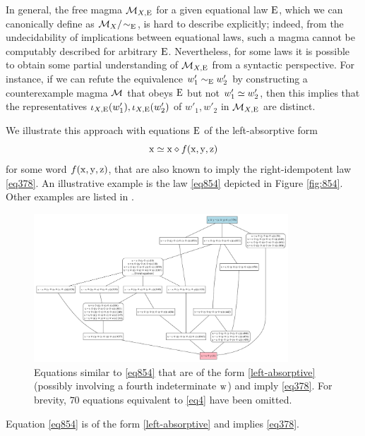 In general, the free magma ${\mathcal{M}}_{X,\mathrm{E}}$ for a given equational law $\mathrm{E}$, which we can canonically define as ${\mathcal{M}}_X/\!\sim_{\mathrm{E}}$, is hard to describe explicitly; indeed, from the undecidability of implications between equational laws, such a magma cannot be computably described for arbitrary $\mathrm{E}$.  Nevertheless, for some laws it is possible to obtain some partial understanding of ${\mathcal{M}}_{X,\mathrm{E}}$ from a syntactic perspective.  For instance, if we can refute the equivalence $w'_1 \sim_{\mathrm{E}} w'_2$ by constructing a counterexample magma ${\mathcal{M}}$ that obeys $\mathrm{E}$ but not $w'_1 \simeq w'_2$, then this implies that the representatives $\iota_{X,\mathrm{E}}(w'_1), \iota_{X,\mathrm{E}}(w'_2)$ of  $w'_1, w'_2$ in ${\mathcal{M}}_{X,\mathrm{E}}$ are distinct.

We illustrate this approach with equations $\mathrm{E}$ of the left-absorptive form
\begin{equation}\label{left-absorptive}
\mathrm{x} \simeq \mathrm{x} \diamond f(\mathrm{x},\mathrm{y},\mathrm{z})
\end{equation}
for some word $f(\mathrm{x},\mathrm{y},\mathrm{z})$, that are also known to imply the right-idempotent law \eqref{eq378}.  An illustrative example is the law \eqref{eq854} depicted in Figure \ref{fig:854}. Other examples are listed in .

\begin{figure}
  \centering
  \includegraphics[width=0.85\textwidth]{854-like.png}
  \caption{Equations similar to \eqref{eq854} that are of the form \eqref{left-absorptive} (possibly involving a fourth indeterminate $\mathrm{w}$) and imply \eqref{eq378}.  For brevity, $70$ equations equivalent to \eqref{eq4} have been omitted.}
  \label{fig:854-like}
  \end{figure}


\begin{lemma}\label{854} Equation \eqref{eq854} is of the form \eqref{left-absorptive} and implies \eqref{eq378}.
\end{lemma}

